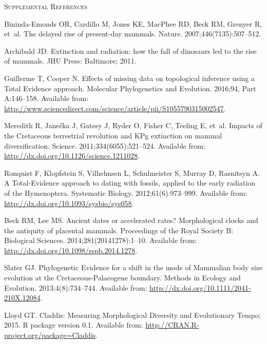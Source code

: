 \documentclass[12pt,letterpaper]{article}
\renewcommand{\section}[1]{%
\bigskip
\begin{center}
\begin{Large}
\normalfont\scshape #1
\medskip
\end{Large}
\end{center}}
\begin{document}
\section{Supplemental References}
\begin{thebibliography}{10}

Bininda-Emonds OR, Cardillo M, Jones KE, MacPhee RD, Beck RM, Grenyer R, et~al.
\newblock The delayed rise of present-day mammals.
\newblock Nature. 2007;446(7135):507--512.

Archibald JD.
\newblock Extinction and radiation: how the fall of dinosaurs led to the rise
  of mammals.
\newblock JHU Press: Baltimore; 2011.

Guillerme T, Cooper N.
\newblock Effects of missing data on topological inference using a {T}otal
  {E}vidence approach.
\newblock Molecular Phylogenetics and Evolution. 2016;94, Part A:146--158.
\newblock Available from:
  \url{http://www.sciencedirect.com/science/article/pii/S1055790315002547}.

Meredith R, Jane\v{c}ka J, Gatesy J, Ryder O, Fisher C, Teeling E, et~al.
\newblock Impacts of the {C}retaceous terrestrial revolution and {K}{P}g
  extinction on mammal diversification.
\newblock Science. 2011;334(6055):521--524.
\newblock Available from: \url{http://dx.doi.org/10.1126/science.1211028}.

Ronquist F, Klopfstein S, Vilhelmsen L, Schulmeister S, Murray D, Rasnitsyn A.
\newblock A {T}otal-{E}vidence approach to dating with fossils, applied to the
  early radiation of the {H}ymenoptera.
\newblock Systematic Biology. 2012;61(6):973--999.
\newblock Available from: \url{http://dx.doi.org/10.1093/sysbio/sys058}.

Beck RM, Lee MS.
\newblock Ancient dates or accelerated rates? {M}orphological clocks and the
  antiquity of placental mammals.
\newblock Proceedings of the Royal Society B: Biological Sciences.
  2014;281(20141278):1--10.
\newblock Available from: \url{http://dx.doi.org/10.1098/rspb.2014.1278}.

Slater GJ.
\newblock Phylogenetic {E}vidence for a shift in the mode of {M}ammalian body
  size evolution at the {C}retaceous-{P}alaeogene boundary.
\newblock Methods in Ecology and Evolution. 2013;4(8):734--744.
\newblock Available from: \url{http://dx.doi.org/10.1111/2041-210X.12084}.

Lloyd GT. Claddis: Measuring Morphological Diversity and Evolutionary Tempo;
  2015.
\newblock R package version 0.1.
\newblock Available from: \url{http://CRAN.R-project.org/package=Claddis}.

\end{thebibliography}
\end{document}
